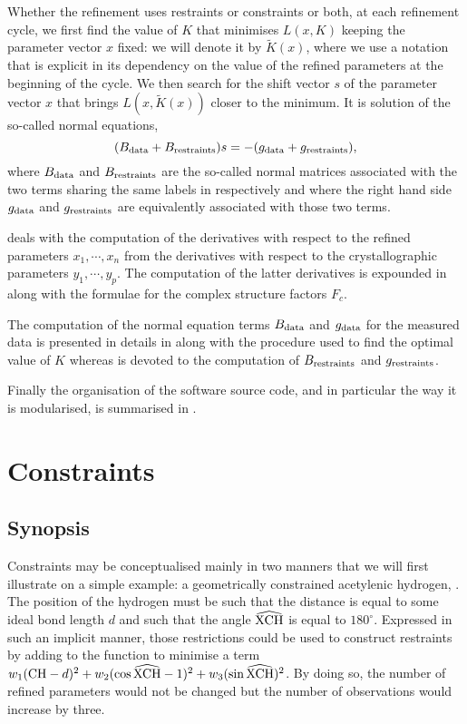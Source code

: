\documentclass[pdf]{iucr}
\begin{document}
Whether the refinement uses restraints or constraints or both, at each refinement cycle, we first find the value of $K$ that minimises $L(x, K)$ keeping the parameter vector $x$ fixed: we will denote it by $\tilde{K}(x)$, where we use a notation that is explicit in its dependency on the value of the refined parameters at the beginning of the cycle. We then search for the shift vector $s$ of the parameter vector $x$ that brings $L(x, \tilde{K}(x))$ closer to the minimum. It is solution of the so-called normal equations,
\begin{equation}
(B_{\text{data}} + B_{\text{restraints}})s = -(g_{\text{data}} + g_{\text{restraints}}),
\label{eqn:generalnormalequations}
\end{equation}
where $B_{\text{data}}$ and $B_{\text{restraints}}$ are the so-called normal matrices associated with the two terms sharing the same labels in  respectively and where the right hand side $g_{\text{data}}$ and $g_{\text{restraints}}$ are equivalently associated with those two terms.

 deals with the computation of the derivatives with respect to the refined parameters $x_1, \cdots, x_n$ from the derivatives with respect to the crystallographic parameters $y_1, \cdots, y_p$. The computation of the latter derivatives is expounded in  along with the formulae for the complex structure factors $F_c$.

The computation of the normal equation terms $B_{\text{data}}$ and $g_{\text{data}}$ for the measured data is presented in details in  along with the procedure used to find the optimal value of $K$ whereas  is devoted to the computation of $B_{\text{restraints}}$ and $g_{\text{restraints}}$.

Finally the organisation of the software source code, and in particular the way it is modularised, is summarised in . 

\section{Constraints}
\label{sec:constraints}

\subsection{Synopsis}

Constraints may be conceptualised mainly in two manners that we will first illustrate on a simple example: a geometrically constrained acetylenic hydrogen, . The position of the hydrogen must be such that the distance  is equal to some ideal bond length $d$ and such that the angle $\widehat{\ce{XCH}}$ is equal to $180^\circ$. Expressed in such an implicit manner, those restrictions could be used to construct restraints by adding to the function to minimise a term $w_1 (\ce{CH} - d)^2 + w_2 (\cos \widehat{\ce{XCH}} - 1)^2 + w_3 (\sin  \widehat{\ce{XCH}})^2$. By doing so, the number of refined parameters would not be changed but the number of observations would increase by three. 
\end{document}
